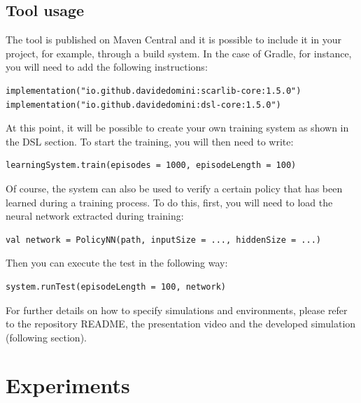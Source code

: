 \subsection{Tool usage}
The tool is published on Maven Central 
 and it is possible to include it in your project, 
 for example, through a build system. 
 In the case of Gradle, for instance, 
 you will need to add the following instructions:
\begin{lstlisting}
implementation("io.github.davidedomini:scarlib-core:1.5.0")
implementation("io.github.davidedomini:dsl-core:1.5.0")
\end{lstlisting}
%
At this point, it will be possible to create 
 your own training system as shown in the DSL section. 
 To start the training, you will then need to write:
\begin{lstlisting}
learningSystem.train(episodes = 1000, episodeLength = 100)
\end{lstlisting}
%
Of course, 
 the system can also be used to verify a certain 
 policy that has been learned during a training process. 
% 
To do this, first, 
 you will need to load the neural network extracted during training:
\begin{lstlisting}
val network = PolicyNN(path, inputSize = ..., hiddenSize = ...)
\end{lstlisting}
Then you can execute the test in the following way:
\begin{lstlisting}
system.runTest(episodeLength = 100, network)
\end{lstlisting}
For further details on how to specify simulations and environments, 
 please refer to the repository README, 
 the presentation video and 
 the developed simulation (following section).
\section{Experiments}\label{coordination2023:experiments}

